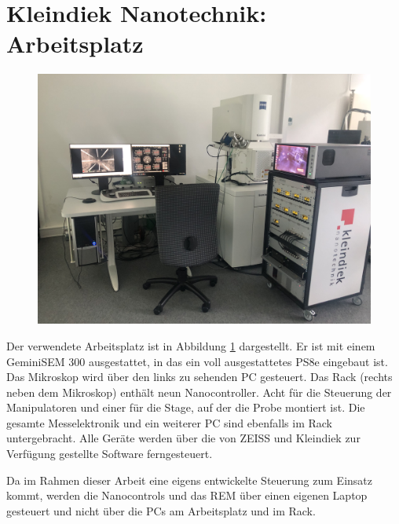 \section{Kleindiek Nanotechnik: Arbeitsplatz}
\begin{figure}[h]
    \centering
    \includegraphics[width=\linewidth]{img/workplace.JPG}
    \label{fig:workplace}
\end{figure}
Der verwendete Arbeitsplatz ist in Abbildung \ref{fig:workplace} dargestellt.
Er ist mit einem GeminiSEM 300 ausgestattet, in das ein voll ausgestattetes PS8e eingebaut ist. Das Mikroskop wird über den links zu sehenden PC gesteuert.
Das Rack (rechts neben dem Mikroskop) enthält neun Nanocontroller. Acht für die Steuerung der Manipulatoren und einer für die Stage, auf der die Probe montiert ist. Die gesamte Messelektronik und ein weiterer PC sind ebenfalls im Rack untergebracht. Alle Geräte werden über die von ZEISS und Kleindiek zur Verfügung gestellte Software ferngesteuert.

Da im Rahmen dieser Arbeit eine eigens entwickelte Steuerung zum Einsatz kommt, werden die Nanocontrols und das REM über einen eigenen Laptop gesteuert und nicht über die PCs am Arbeitsplatz und im Rack.